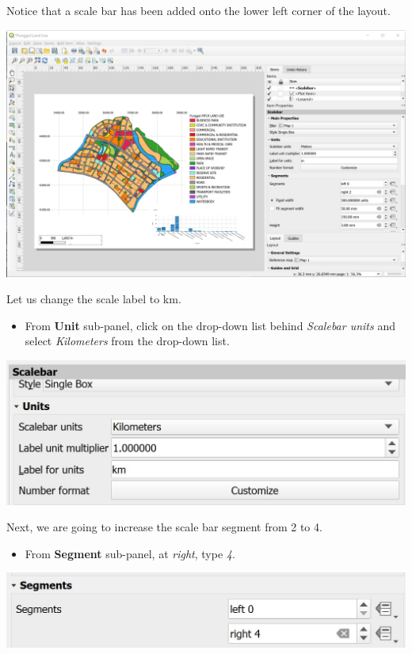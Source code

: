 \documentclass[
  letterpaper,
  DIV=11,
  numbers=noendperiod]{scrreprt}
\providecommand{\tightlist}{%
  \setlength{\itemsep}{0pt}\setlength{\parskip}{0pt}}\usepackage{longtable,booktabs,array}
\begin{document}
Notice that a scale bar has been added onto the lower left corner of the
layout.

\includegraphics{./img04/image75.jpg}

Let us change the scale label to km.

\begin{itemize}
\tightlist
\item
  From \textbf{Unit} sub-panel, click on the drop-down list behind
  \emph{Scalebar units} and select \emph{Kilometers} from the drop-down
  list.
\end{itemize}

\includegraphics{./img04/image76.jpg}

Next, we are going to increase the scale bar segment from 2 to 4.

\begin{itemize}
\tightlist
\item
  From \textbf{Segment} sub-panel, at \emph{right}, type \emph{4}.
\end{itemize}

\includegraphics{./img04/image77.jpg}
\end{document}
